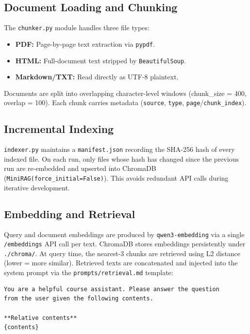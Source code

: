 \documentclass[11pt,a4paper]{article}
\begin{document}
\subsection{Document Loading and Chunking}

The \texttt{chunker.py} module handles three file types:

\begin{itemize}
    \item \textbf{PDF:} Page-by-page text extraction via \texttt{pypdf}.
    \item \textbf{HTML:} Full-document text stripped by \texttt{BeautifulSoup}.
    \item \textbf{Markdown/TXT:} Read directly as UTF-8 plaintext.
\end{itemize}

Documents are split into overlapping character-level windows
(chunk\_size = 400, overlap = 100).  Each chunk carries metadata
(\texttt{source}, \texttt{type}, \texttt{page}/\texttt{chunk\_index}).

\subsection{Incremental Indexing}

\texttt{indexer.py} maintains a \texttt{manifest.json} recording the SHA-256
hash of every indexed file.  On each run, only files whose hash has changed since
the previous run are re-embedded and upserted into ChromaDB
(\texttt{MiniRAG(force\_initial=False)}).  This avoids redundant API calls during
iterative development.

\subsection{Embedding and Retrieval}

Query and document embeddings are produced by \texttt{qwen3-embedding} via a
single \texttt{/embeddings} API call per text.  ChromaDB stores embeddings
persistently under \texttt{./chroma/}.  At query time, the nearest-3 chunks are
retrieved using L2 distance (lower = more similar).  Retrieved texts are
concatenated and injected into the system prompt via the
\texttt{prompts/retrieval.md} template:

\begin{lstlisting}[language={}]
You are a helpful course assistant. Please answer the question
from the user given the following contents.

**Relative contents**
{contents}
\end{lstlisting}
\end{document}
